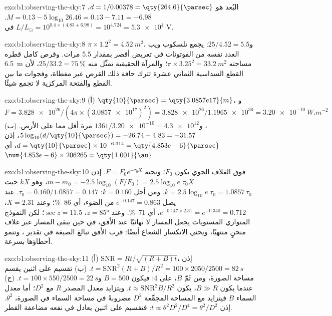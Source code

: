 \begin{solution}{exo:b1:observing-the-sky:7}
البُعد هو $d = 1/0.00378 = \qty{264.6}{\parsec}$، 
$M = 0.13 - 5\log_{10}26.46 = 0.13 - 7.11 = -6.98$. $L/L_\odot = 10^{0.4\times(4.83 + 6.98)} =
10^{4.724} = \num{5.3e4}$ في V.
\end{solution}

\begin{solution}{exo:b1:observing-the-sky:8}
$\pi\times1.2^2 = \qty{4.52}{m^2}$، و$25/4.52 = 5.5$: يجمع تلسكوب ويب العدد نفسه من الفوتونات في تعريض أقصر بمقدار 5.5 مرات. وقرص كامل قطره \qty{6.5}{m} مساحته $\pi\times3.25^2 = \qty{33.2}{m^2}$؛ والمرآة الحقيقية تمثّل منه $25/33.2 = \qty{75}{\percent}$، لأن القطع السداسية الثماني عشرة تترك حافة ذلك القرص غير مغطاة، وفجوات ما بين القطع والفتحة المركزية لا تجمع شيئًا.
\end{solution}

\begin{solution}{exo:b1:observing-the-sky:9}
(أ) $\qty{10}{\parsec} = \qty{3.0857e17}{m}$، و$F = \num{3.828e26}/(4\pi
\times(\num{3.0857e17})^2) = \num{3.828e26}/\num{1.1965e36} =
\qty{3.20e-10}{W.m^{-2}}$، و$1361/\num{3.20e-10} = \num{4.3e12}$ مرة أقل مما على الأرض.
(ب) $5\log_{10}(d/\qty{10}{\parsec}) = -26.74 - 4.83 = -31.57$، إذن
$d = \qty{10}{\parsec}\times10^{-6.314} = \qty{4.853e-6}{\parsec}$، أي
$\num{4.853e-6}\times206265 = \qty{1.001}{\au}$.
\end{solution}

\begin{solution}{exo:b1:observing-the-sky:10}
فوق الغلاف الجوي يكون  $F_0$؛ وتحته $F = F_0e^{-\tau_0X}$. إذن
$m - m_0 = -2.5\log_{10}(F/F_0) = 2.5\log_{10}e\;\tau_0X$، وهو $kX$ حيث
$k = 2.5\log_{10}e\;\tau_0 = 1.0857\,\tau_0$. ومن أجل $k = 0.160$:
$\tau_0 = 0.160/1.0857 = 0.147$. عند  يصل $e^{-0.147} = 0.863$ من الضوء،
أي \qty{86}{\percent}؛ وعند $X = 2.31$، $e^{-0.147\times2.31} =
e^{-0.340} = 0.712$، أي \qty{71}{\percent}. وعند $z = \ang{85}$، $\sec z =
11.5$؛ لكن النموذج المتوازي المستويات يجعل المسار لا نهائيًا عند الأفق،
في حين يبقى المسار عبر غلاف منحنٍ منتهيًا، ويحني الانكسار الشعاع أيضًا:
قرب الأفق تبالغ الصيغة في تقدير ، وتنمو أخطاؤها بسرعة.
\end{solution}

\begin{solution}{exo:b1:observing-the-sky:11}
(أ) $\mathrm{SNR} = Rt/\sqrt{(R + B)t}$، إذن $t = \mathrm{SNR}^2(R + B)/R^2
= 100\times2050/2500 = \qty{82}{s}$. (ب) تقسيم  على اثنين يقسم
مساحة الصورة، ومن ثَمّ $B$، على 4: فيكون $B = 500$ و$t = 100\times550/2500 =
\qty{22}{s}$. (ج) عندما يكون $B \gg R$، يكون $t \approx \mathrm{SNR}^2B/R^2$. ويتزايد معدل المصدر $R$ مع $D^2$؛ أما معدل السماء $B$ فيتزايد مع المساحة المجمِّعة
$D^2$ مضروبةً في مساحة السماء في الصورة، $\theta^2$. إذن $t \propto
\theta^2D^2/D^4 = \theta^2/D^2$: فتقسيم  على اثنين يعادل في نفعه مضاعفة القطر.
\end{solution}

